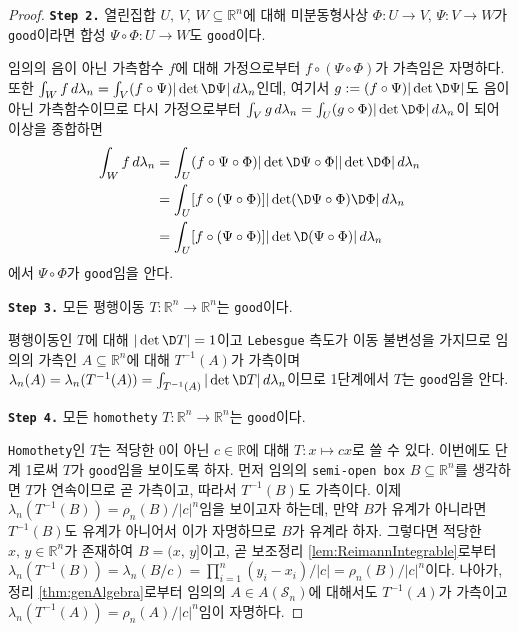 \begin{proof}
    \noindent\texttt{\textbf{Step 2.}} 열린집합 $U,\,V,\,W\subseteq\mathbb{R}^n$에 대해 미분동형사상 $\Phi:U\to V,\,\Psi:V\to W$가 \texttt{good}이라면 합성 $\Psi\circ\Phi:U\to W$도 \texttt{good}이다.

    임의의 음이 아닌 가측함수 $f$에 대해 가정으로부터 $f\circ(\Psi\circ\Phi)$가 가측임은 자명하다. 또한 $\int_Wf\,d\lambda_n=\int_V(f\circ\Psi)|\det\D\Psi|\,d\lambda_n$인데, 여기서 $g:=(f\circ\Psi)|\det\D\Psi|$도 음이 아닌 가측함수이므로 다시 가정으로부터 $\int_Vg\,d\lambda_n=\int_U(g\circ\Phi)|\det\D\Phi|\,d\lambda_n$이 되어 이상을 종합하면
    \begin{align*}
        \int_Wf\,d\lambda_n&=\int_U(f\circ\Psi\circ\Phi)|\det\D\Psi\circ\Phi||\det\D\Phi|\,d\lambda_n\\
        &=\int_U[f\circ(\Psi\circ\Phi)]|\det(\D\Psi\circ\Phi)\D\Phi|\,d\lambda_n\\
        &=\int_U[f\circ(\Psi\circ\Phi)]|\det\D(\Psi\circ\Phi)|\,d\lambda_n
    \end{align*}
    에서 $\Psi\circ\Phi$가 \texttt{good}임을 안다.

    \noindent\texttt{\textbf{Step 3.}} 모든 평행이동 $T:\mathbb{R}^n\to\mathbb{R}^n$는 \texttt{good}이다.

    평행이동인 $T$에 대해 $|\det\D T|=1$이고 \texttt{Lebesgue} 측도가 이동 불변성을 가지므로 임의의 가측인 $A\subseteq\mathbb{R}^n$에 대해 $T^{-1}(A)$가 가측이며 $\lambda_n(A)=\lambda_n(T^{-1}(A))=\int_{T^{-1}(A)}|\det\D T|\,d\lambda_n$이므로 1단계에서 $T$는 \texttt{good}임을 안다.

    \noindent\texttt{\textbf{Step 4.}} 모든 \texttt{homothety} $T:\mathbb{R}^n\to\mathbb{R}^n$는 \texttt{good}이다.

    \texttt{Homothety}인 $T$는 적당한 0이 아닌 $c\in\mathbb{R}$에 대해 $T:x\mapsto cx$로 쓸 수 있다. 이번에도 단계 1로써 $T$가 \texttt{good}임을 보이도록 하자. 먼저 임의의 \texttt{semi-open box} $B\subseteq\mathbb{R}^n$를 생각하면 $T$가 연속이므로 곧 가측이고, 따라서 $T^{-1}(B)$도 가측이다. 이제 $\lambda_n(T^{-1}(B))=\rho_n(B)/|c|^n$임을 보이고자 하는데, 만약 $B$가 유계가 아니라면 $T^{-1}(B)$도 유계가 아니어서 이가 자명하므로 $B$가 유계라 하자. 그렇다면 적당한 $x,\,y\in\mathbb{R}^n$가 존재하여 $B=(x,\,y]$이고, 곧 보조정리 \ref{lem:ReimannIntegrable}로부터 $\lambda_n(T^{-1}(B))=\lambda_n(B/c)=\prod_{i=1}^n(y_i-x_i)/|c|=\rho_n(B)/|c|^n$이다.\footnotemark\label{note:rotateSemiOpenBox} 나아가, 정리 \ref{thm:genAlgebra}로부터 임의의 $A\in A(\mathcal{S}_n)$에 대해서도 $T^{-1}(A)$가 가측이고 $\lambda_n(T^{-1}(A))=\rho_n(A)/|c|^n$임이 자명하다.
    

\end{proof}

